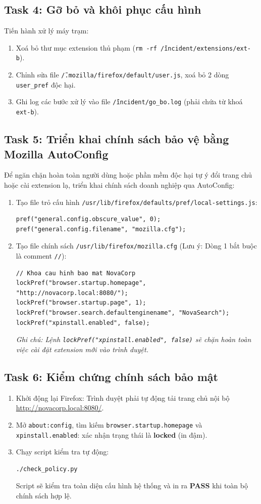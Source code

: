 \subsection{Task 4: Gỡ bỏ và khôi phục cấu hình}
Tiến hành xử lý máy trạm:
\begin{enumerate}
    \item Xoá bỏ thư mục extension thủ phạm (\texttt{rm -rf \~/incident/extensions/ext-b}).
    \item Chỉnh sửa file \texttt{\~/.mozilla/firefox/default/user.js}, xoá bỏ 2 dòng \texttt{user\_pref} độc hại.
    \item Ghi log các bước xử lý vào file \texttt{\~/incident/go\_bo.log} (phải chứa từ khoá \texttt{ext-b}).
\end{enumerate}

\subsection{Task 5: Triển khai chính sách bảo vệ bằng Mozilla AutoConfig}
Để ngăn chặn hoàn toàn người dùng hoặc phần mềm độc hại tự ý đổi trang chủ hoặc cài extension lạ, triển khai chính sách doanh nghiệp qua AutoConfig:
\begin{enumerate}
    \item Tạo file trỏ cấu hình \texttt{/usr/lib/firefox/defaults/pref/local-settings.js}:
\begin{verbatim}
pref("general.config.obscure_value", 0);
pref("general.config.filename", "mozilla.cfg");
\end{verbatim}
    \item Tạo file chính sách \texttt{/usr/lib/firefox/mozilla.cfg} (Lưu ý: Dòng 1 bắt buộc là comment \texttt{//}):
\begin{verbatim}
// Khoa cau hinh bao mat NovaCorp
lockPref("browser.startup.homepage", "http://novacorp.local:8080/");
lockPref("browser.startup.page", 1);
lockPref("browser.search.defaultenginename", "NovaSearch");
lockPref("xpinstall.enabled", false);
\end{verbatim}
    \textit{Ghi chú: Lệnh \texttt{lockPref("xpinstall.enabled", false)} sẽ chặn hoàn toàn việc cài đặt extension mới vào trình duyệt.}
\end{enumerate}

\subsection{Task 6: Kiểm chứng chính sách bảo mật}
\begin{enumerate}
    \item Khởi động lại Firefox: Trình duyệt phải tự động tải trang chủ nội bộ \url{http://novacorp.local:8080/}.
    \item Mở \texttt{about:config}, tìm kiếm \texttt{browser.startup.homepage} và \texttt{xpinstall.enabled}: xác nhận trạng thái là \textbf{locked} (in đậm).
    \item Chạy script kiểm tra tự động:
\begin{verbatim}
./check_policy.py
\end{verbatim}
Script sẽ kiểm tra toàn diện cấu hình hệ thống và in ra \textbf{PASS} khi toàn bộ chính sách hợp lệ.
\end{enumerate}


